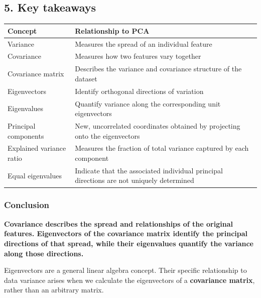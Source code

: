 \documentclass[11pt]{article}
\begin{document}
\subsection{5. Key takeaways}\label{key-takeaways}

{\def\LTcaptype{none} %
\begin{longtable}[]{@{}
  >{\raggedright\arraybackslash}p{}
  >{\raggedright\arraybackslash}p{}@{}}
\toprule\noalign{}
\begin{minipage}[b]{\linewidth}\raggedright
Concept
\end{minipage} & \begin{minipage}[b]{\linewidth}\raggedright
Relationship to PCA
\end{minipage} \\
\midrule\noalign{}
\endhead
\bottomrule\noalign{}
\endlastfoot
Variance & Measures the spread of an individual feature \\
Covariance & Measures how two features vary together \\
Covariance matrix & Describes the variance and covariance structure of
the dataset \\
Eigenvectors & Identify orthogonal directions of variation \\
Eigenvalues & Quantify variance along the corresponding unit
eigenvectors \\
Principal components & New, uncorrelated coordinates obtained by
projecting onto the eigenvectors \\
Explained variance ratio & Measures the fraction of total variance
captured by each component \\
Equal eigenvalues & Indicate that the associated individual principal
directions are not uniquely determined \\
\end{longtable}
}

\subsubsection{Conclusion}\label{conclusion}

\textbf{Covariance describes the spread and relationships of the
original features. Eigenvectors of the covariance matrix identify the
principal directions of that spread, while their eigenvalues quantify
the variance along those directions.}

Eigenvectors are a general linear algebra concept. Their specific
relationship to data variance arises when we calculate the eigenvectors
of a \textbf{covariance matrix}, rather than an arbitrary matrix.
\end{document}
